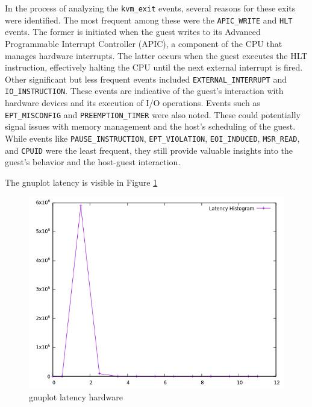 \documentclass[MMR,Master,english]{twbook}
\begin{document}

\noindent In the process of analyzing the \texttt{kvm\_exit} events, several reasons for these exits were identified. The most frequent among these were the \texttt{APIC\_WRITE} and \texttt{HLT} events. The former is initiated when the guest writes to its Advanced Programmable Interrupt Controller (APIC), a component of the CPU that manages hardware interrupts. The latter occurs when the guest executes the HLT instruction, effectively halting the CPU until the next external interrupt is fired. Other significant but less frequent events included \texttt{EXTERNAL\_INTERRUPT} and \texttt{IO\_INSTRUCTION}. These events are indicative of the guest's interaction with hardware devices and its execution of I/O operations. Events such as \texttt{EPT\_MISCONFIG} and \texttt{PREEMPTION\_TIMER} were also noted. These could potentially signal issues with memory management and the host's scheduling of the guest. While events like \texttt{PAUSE\_INSTRUCTION}, \texttt{EPT\_VIOLATION}, \texttt{EOI\_INDUCED}, \texttt{MSR\_READ}, and \texttt{CPUID} were the least frequent, they still provide valuable insights into the guest's behavior and the host-guest interaction.

The gnuplot latency is visible in Figure \ref{fig:gnuplot_max_latency_hardware}
\begin{figure}[H]
	\centering
	\includegraphics[width=0.8\columnwidth]{masterthesis-documentation/docs/sigmatek/xenomai/hardware/gnuplot_max_latency_hardware.png}
	\caption[gnuplot latency hardware]{gnuplot latency hardware}
	\label{fig:gnuplot_max_latency_hardware}
\end{figure}
\end{document}
